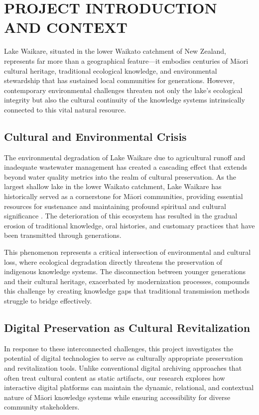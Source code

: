 ﻿\section{PROJECT INTRODUCTION AND CONTEXT}

Lake Waikare, situated in the lower Waikato catchment of New Zealand, represents far more than a geographical feature—it embodies centuries of M\=aori cultural heritage, traditional ecological knowledge, and environmental stewardship that has sustained local communities for generations. However, contemporary environmental challenges threaten not only the lake's ecological integrity but also the cultural continuity of the knowledge systems intrinsically connected to this vital natural resource.

\subsection{Cultural and Environmental Crisis}

The environmental degradation of Lake Waikare due to agricultural runoff and inadequate wastewater management has created a cascading effect that extends beyond water quality metrics into the realm of cultural preservation. As the largest shallow lake in the lower Waikato catchment, Lake Waikare has historically served as a cornerstone for M\=aori communities, providing essential resources for sustenance and maintaining profound spiritual and cultural significance \cite{regional_council_2024}. The deterioration of this ecosystem has resulted in the gradual erosion of traditional knowledge, oral histories, and customary practices that have been transmitted through generations.

This phenomenon represents a critical intersection of environmental and cultural loss, where ecological degradation directly threatens the preservation of indigenous knowledge systems. The disconnection between younger generations and their cultural heritage, exacerbated by modernization processes, compounds this challenge by creating knowledge gaps that traditional transmission methods struggle to bridge effectively.

\subsection{Digital Preservation as Cultural Revitalization}

In response to these interconnected challenges, this project investigates the potential of digital technologies to serve as culturally appropriate preservation and revitalization tools. Unlike conventional digital archiving approaches that often treat cultural content as static artifacts, our research explores how interactive digital platforms can maintain the dynamic, relational, and contextual nature of M\=aori knowledge systems while ensuring accessibility for diverse community stakeholders.

